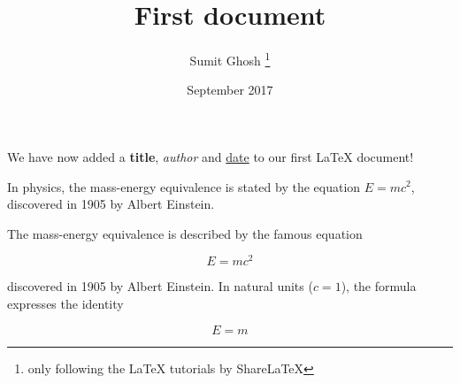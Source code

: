 \documentclass[12pt, letterpaper]{article}
\title{First document}
\author{Sumit Ghosh \thanks{only following the LaTeX tutorials by ShareLaTeX}}
\date{September 2017}
\begin{document}
\maketitle

We have now added a \textbf{title}, \textit{author} and \underline{date} to our first \LaTeX{} document!

In physics, the mass-energy equivalence is stated by the equation $E=mc^2$, discovered in 1905 by Albert Einstein.

The mass-energy equivalence is described by the famous equation

$$E=mc^2$$

discovered in 1905 by Albert Einstein.
In natural units ($c=1$), the formula expresses the identity

\begin{equation}
E=m
\end{equation}
\end{document}
